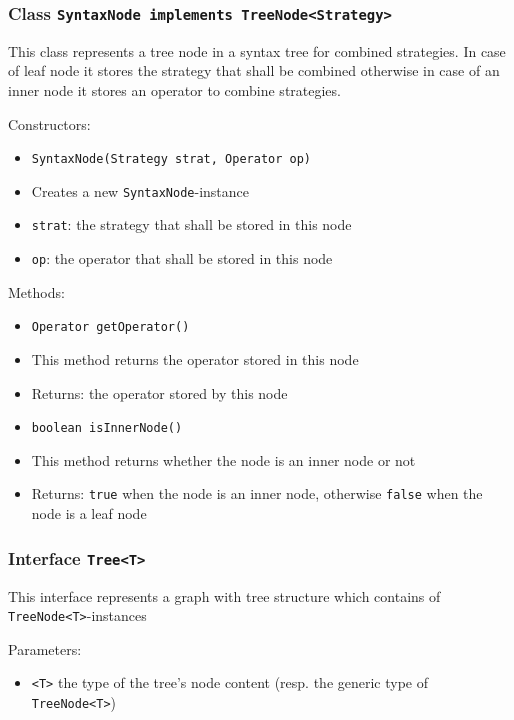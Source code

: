 \documentclass[parskip=full,11pt]{scrartcl}
\begin{document}
\subsubsection{Class \texttt{SyntaxNode implements TreeNode<Strategy>}}

This class represents a tree node in a syntax tree for combined strategies. In case of leaf node it stores the strategy that shall be combined otherwise in case of an inner node it stores an operator to combine strategies.

Constructors:
\begin{itemize} \itemsep -10pt
	\item \texttt{SyntaxNode(Strategy strat, Operator op)}
	\item[] Creates a new \texttt{SyntaxNode}-instance 
	\item[] \texttt{strat}: the strategy that shall be stored in this node
	\item[] \texttt{op}: the operator that shall be stored in this node
\end{itemize}

Methods:
\begin{itemize} \itemsep -10pt
	\item \texttt{Operator getOperator()}
	\item[] This method returns the operator stored in this node
	\item[] Returns: the operator stored by this node
	
	\item \texttt{boolean isInnerNode()}
	\item[] This method returns whether the node is an inner node or not
	\item[] Returns: \texttt{true} when the node is an inner node, otherwise  \texttt{false} when the node is a leaf node
\end{itemize}

\subsubsection{Interface \texttt{Tree<T>}}

This interface represents a graph with tree structure which contains of \texttt{TreeNode<T>}-instances

Parameters:
\begin{itemize} \itemsep -10pt
	\item \texttt{<T>} the type of the tree's node content (resp. the generic type of \texttt{TreeNode<T>})
\end{itemize}
\end{document}
